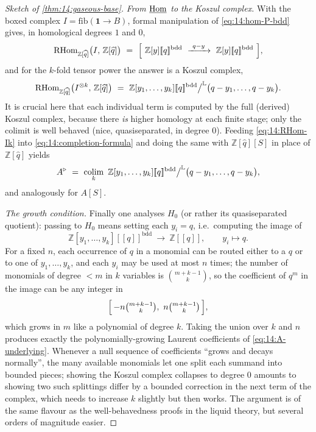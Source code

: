 \begin{proof}[Sketch of \cref{thm:14:gaseous-base}]
\emph{From $\underline{\operatorname{Hom}}$ to the Koszul complex.} With the boxed complex
$I=\mathrm{fib}(\mathbf 1\to B)$, formal manipulation of \eqref{eq:14:hom-P-bdd}
gives, in homological degrees $1$ and $0$,
\begin{equation}
\label{eq:14:RHom-I}
\RHom_{\mathbb{Z}[\widehat q]}\bigl(I,\,\mathbb{Z}[\widehat q]\bigr)\ =\ \Bigl[\ \mathbb{Z}[y][\![q]\!]^{\mathrm{bdd}}\ \xrightarrow{\ q-y\ }\ \mathbb{Z}[y][\![q]\!]^{\mathrm{bdd}}\ \Bigr],
\end{equation}
and for the $k$-fold tensor power the answer is a Koszul complex,
\begin{equation}
\label{eq:14:RHom-Ik}
\RHom_{\mathbb{Z}[\widehat q]}\bigl(I^{\otimes k},\,\mathbb{Z}[\widehat q]\bigr)\ =\ \mathbb{Z}[y_1,\dots,y_k][\![q]\!]^{\mathrm{bdd}}\big/^{\mathbb{L}}\bigl(q-y_1,\dots,q-y_k\bigr).
\end{equation}
It is crucial here that each individual term is computed by the full (derived)
Koszul complex, because there \emph{is} higher homology at each finite stage;
only the colimit is well behaved (nice, quasiseparated, in degree $0$). Feeding
\eqref{eq:14:RHom-Ik} into \eqref{eq:14:completion-formula} and doing the same with
$\mathbb{Z}[\widehat q][S]$ in place of $\mathbb{Z}[\widehat q]$ yields
\begin{equation}
\label{eq:14:A-colim}
\ur A\ =\ \operatorname*{colim}_k\ \mathbb{Z}[y_1,\dots,y_k][\![q]\!]^{\mathrm{bdd}}\big/^{\mathbb{L}}\bigl(q-y_1,\dots,q-y_k\bigr),
\end{equation}
and analogously for $A[S]$.

\emph{The growth condition.} Finally one analyses $H_0$ (or rather its
quasiseparated quotient): passing to $H_0$ means setting each $y_i=q$, i.e.\
computing the image of
\begin{equation*}
\mathbb{Z}[y_1,\dots,y_k][\![q]\!]^{\mathrm{bdd}}\ \longrightarrow\ \mathbb{Z}[\![q]\!],\qquad y_i\longmapsto q.
\end{equation*}
For a fixed $n$, each occurrence of $q$ in a monomial can be routed either to a
$q$ or to one of $y_1,\dots,y_k$, and each $y_i$ may be used at most $n$ times; the
number of monomials of degree $<m$ in $k$ variables is $\binom{m+k-1}{k}$, so the
coefficient of $q^m$ in the image can be any integer in
\begin{equation*}
\Bigl[\,-n\tbinom{m+k-1}{k},\ n\tbinom{m+k-1}{k}\,\Bigr],
\end{equation*}
which grows in $m$ like a polynomial of degree $k$. Taking the union over $k$ and
$n$ produces exactly the polynomially-growing Laurent coefficients of
\eqref{eq:14:A-underlying}. Whenever a null sequence of coefficients ``grows and
decays normally'', the many available monomials let one split each summand into
bounded pieces; showing the Koszul complex collapses to degree $0$ amounts to
showing two such splittings differ by a bounded correction in the next term of the
complex, which needs to increase $k$ slightly but then works. The argument is of
the same flavour as the well-behavedness proofs in the liquid theory, but several
orders of magnitude easier.
\end{proof}

